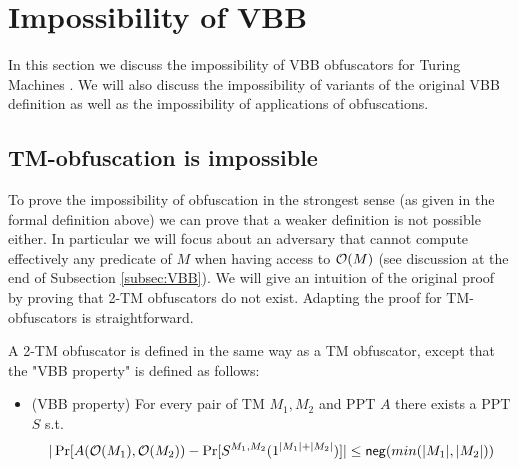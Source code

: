 \section{Impossibility of VBB}
\label{sec:VBB-imp}

In this section we discuss the impossibility of VBB obfuscators for Turing Machines \cite{VBB-imp}. We will also discuss the impossibility of variants of the original VBB definition as well as the impossibility of applications of obfuscations.


\subsection{TM-obfuscation is impossible}

To prove the impossibility of obfuscation in the strongest sense (as given in the formal definition above) we can prove that a weaker definition is not possible either. In particular we will focus about an adversary that cannot compute effectively any predicate of $M$ when having access to $\mathcal{O}(M)$ (see discussion at the end of Subsection \ref{subsec:VBB}).
We will give an intuition of the original proof by proving that 2-TM obfuscators do not exist. Adapting the proof for TM-obfuscators is straightforward.

\begin{mydef}
	A 2-TM obfuscator is defined in the same way as a TM obfuscator, except that the "VBB property" is defined as follows:
	\begin{itemize}
		\item (VBB property) For every pair of TM $M_1, M_2$ and PPT $A$ there exists a PPT $S$ s.t. 
		$$ |\Pr[A(\mathcal{O}(M_1), \mathcal{O}(M_2)) - \Pr[ S^{M_1,M_2}(1^{|M_1|+|M_2|})]| \leq \mathsf{neg}(min(|M_1|, |M_2|)) $$
	\end{itemize}
\end{mydef} 

